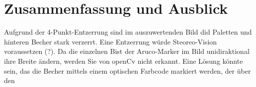 \chapter{Zusammenfassung und Ausblick}

Aufgrund der 4-Punkt-Entzerrung sind im auszuwertenden Bild did Paletten und hinteren Becher stark verzerrt.
Eine Entzerrung würde Steoreo-Vision voraussetzen (?).
Da die einzelnen Bist der Aruco-Marker im Bild unidiraktional ihre Breite ändern, werden Sie von openCv nicht erkannt.
Eine Lösung könnte sein, das die Becher mittels einem optischen Farbcode markiert werden, der über den 

